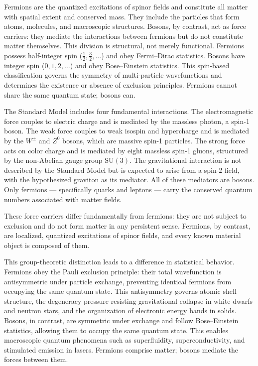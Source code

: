 Fermions are the quantized excitations of spinor fields and constitute all matter with spatial extent and conserved mass. They include the particles that form atoms, molecules, and macroscopic structures. Bosons, by contrast, act as force carriers: they mediate the interactions between fermions but do not constitute matter themselves. This division is structural, not merely functional. Fermions possess half-integer spin ($\tfrac{1}{2}, \tfrac{3}{2}, \ldots$) and obey Fermi–Dirac statistics. Bosons have integer spin ($0, 1, 2, \ldots$) and obey Bose–Einstein statistics. This spin-based classification governs the symmetry of multi-particle wavefunctions and determines the existence or absence of exclusion principles. Fermions cannot share the same quantum state; bosons can.

The Standard Model includes four fundamental interactions. The electromagnetic force couples to electric charge and is mediated by the massless photon, a spin-1 boson. The weak force couples to weak isospin and hypercharge and is mediated by the $W^\pm$ and $Z^0$ bosons, which are massive spin-1 particles. The strong force acts on color charge and is mediated by eight massless spin-1 gluons, structured by the non-Abelian gauge group $\mathrm{SU}(3)$. The gravitational interaction is not described by the Standard Model but is expected to arise from a spin-2 field, with the hypothesized graviton as its mediator. All of these mediators are bosons. Only fermions — specifically quarks and leptons — carry the conserved quantum numbers associated with matter fields.

These force carriers differ fundamentally from fermions: they are not subject to exclusion and do not form matter in any persistent sense. Fermions, by contrast, are localized, quantized excitations of spinor fields, and every known material object is composed of them.

This group-theoretic distinction leads to a difference in statistical behavior. Fermions obey the Pauli exclusion principle: their total wavefunction is antisymmetric under particle exchange, preventing identical fermions from occupying the same quantum state. This antisymmetry governs atomic shell structure, the degeneracy pressure resisting gravitational collapse in white dwarfs and neutron stars, and the organization of electronic energy bands in solids. Bosons, in contrast, are symmetric under exchange and follow Bose–Einstein statistics, allowing them to occupy the same quantum state. This enables macroscopic quantum phenomena such as superfluidity, superconductivity, and stimulated emission in lasers. Fermions comprise matter; bosons mediate the forces between them.

